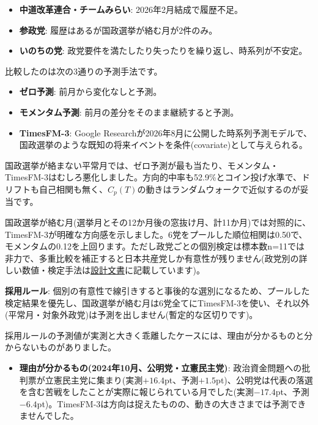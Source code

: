 \documentclass[a4paper,11pt]{ltjsarticle}
\begin{document}
\begin{itemize}
\item \textbf{中道改革連合・チームみらい}: 2026年2月結成で履歴不足。
\item \textbf{参政党}: 履歴はあるが国政選挙が絡む月が2件のみ。
\item \textbf{いのちの党}: 政党要件を満たしたり失ったりを繰り返し、時系列が不安定。
\end{itemize}

比較したのは次の3通りの予測手法です。

\begin{itemize}
\item \textbf{ゼロ予測}: 前月から変化なしと予測。
\item \textbf{モメンタム予測}: 前月の差分をそのまま継続すると予測。
\item \textbf{TimesFM-3}: Google Researchが2026年8月に公開した時系列予測モデルで、国政選挙のような既知の将来イベントを条件(covariate)として与えられる。
\end{itemize}

国政選挙が絡まない平常月では、ゼロ予測が最も当たり、モメンタム・TimesFM-3はむしろ悪化しました。方向的中率も52.9\%とコイン投げ水準で、ドリフトも自己相関も無く、$C_p(T)$の動きはランダムウォークで近似するのが妥当です。

国政選挙が絡む月(選挙月とその12か月後の窓抜け月、計11か月)では対照的に、TimesFM-3が明確な方向感を示しました。6党をプールした順位相関は0.50で、モメンタムの0.12を上回ります。ただし政党ごとの個別検定は標本数n=11では非力で、多重比較を補正すると日本共産党しか有意性が残りません(政党別の詳しい数値・検定手法は\href{https://github.com/hiromichikimura-lang/seiryoku-shisu/blob/master/design_document.pdf}{設計文書}に記載しています)。

\textbf{採用ルール}: 個別の有意性で線引きすると事後的な選別になるため、プールした検定結果を優先し、国政選挙が絡む月は6党全てにTimesFM-3を使い、それ以外(平常月・対象外政党)は予測を出しません(暫定的な区切りです)。

採用ルールの予測値が実測と大きく乖離したケースには、理由が分かるものと分からないものがありました。

\begin{itemize}
\item \textbf{理由が分かるもの(2024年10月、公明党・立憲民主党)}: 政治資金問題への批判票が立憲民主党に集まり(実測$+16.4$pt、予測$+1.5$pt)、公明党は代表の落選を含む苦戦をしたことが実際に報じられている月でした(実測$-17.4$pt、予測$-6.4$pt)。TimesFM-3は方向は捉えたものの、動きの大きさまでは予測できませんでした。
\end{itemize}
\end{document}
